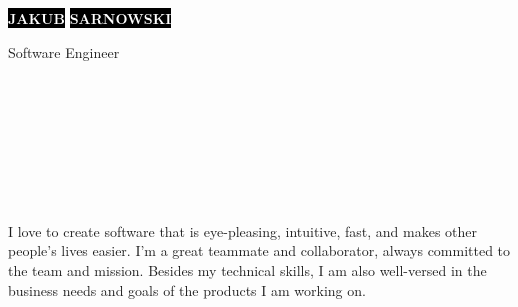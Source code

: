 \documentclass[9pt]{config}
\begin{document}

\begin{minipage}[t]{0.45\textwidth}
  \vspace{-\baselineskip}

  \colorbox{black}{{\HUGE\textcolor{white}{\textbf{\MakeUppercase{Jakub}}}}}
  \colorbox{black}{{\HUGE\textcolor{white}{\textbf{\MakeUppercase{Sarnowski}}}}}

  \vspace{6pt}

  {\huge Software Engineer}
\end{minipage}
\hfill
\begin{minipage}[t]{0.27\textwidth}
  \vspace{-\baselineskip}

  \\
  \\
  \\
\end{minipage}
\hfill
\begin{minipage}[t]{0.27\textwidth}
  \vspace{-\baselineskip}

  \\
  \\
  \\
\end{minipage}

\vspace{12pt}



\begin{minipage}[t]{1\textwidth}
  \vspace{-\baselineskip}

  I love to create software that is eye-pleasing, intuitive, fast,
  and makes other people's lives easier. I’m a great teammate and
  collaborator, always committed to the team and mission. Besides my
  technical skills, I am also well-versed in the business needs and
  goals of the products I am working on.
\end{minipage}
\hfill
\end{document}
